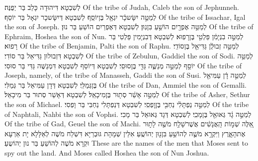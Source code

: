 {לְשִׁבְטָא דִּיהוּדָה כָּלֵב בַּר יְפֻנֶּה׃}
{Of the tribe of Judah, Caleb the son of Jephunneh.}{}
{לְמַטֵּ֣ה יִשָּׂשכָ֔ר יִגְאָ֖ל בֶּן\maqqaf יוֹסֵֽף׃}
{לְשִׁבְטָא דְּיִשָּׂשכָר יִגְאָל בַּר יוֹסֵף׃}
{Of the tribe of Issachar, Igal the son of Joseph.}{}
{לְמַטֵּ֥ה אֶפְרָ֖יִם הוֹשֵׁ֥עַ בִּן\maqqaf נֽוּן׃}
{לְשִׁבְטָא דְּאֶפְרַיִם הוֹשֵׁעַ בַּר נוּן׃}
{Of the tribe of Ephraim, Hoshea the son of Nun.}{}
{לְמַטֵּ֣ה בִנְיָמִ֔ן פַּלְטִ֖י בֶּן\maqqaf רָפֽוּא׃}
{לְשִׁבְטָא דְּבִנְיָמִין פַּלְטִי בַּר רָפוּא׃}
{Of the tribe of Benjamin, Palti the son of Raphu.}{}
{לְמַטֵּ֣ה זְבוּלֻ֔ן גַּדִּיאֵ֖ל בֶּן\maqqaf סוֹדִֽי׃}
{לְשִׁבְטָא דִּזְבוּלוּן גַּדִּיאֵל בַּר סוֹדִי׃}
{Of the tribe of Zebulun, Gaddiel the son of Sodi.}{}
{לְמַטֵּ֥ה יוֹסֵ֖ף לְמַטֵּ֣ה מְנַשֶּׁ֑ה גַּדִּ֖י בֶּן\maqqaf סוּסִֽי׃}
{לְשִׁבְטָא דְּיוֹסֵף לְשִׁבְטָא דִּמְנַשֶּׁה גַּדִּי בַּר סוּסִי׃}
{Of the tribe of Joseph, namely, of the tribe of Manasseh, Gaddi the son of Susi.}{}
{לְמַטֵּ֣ה דָ֔ן עַמִּיאֵ֖ל בֶּן\maqqaf גְּמַלִּֽי׃}
{לְשִׁבְטָא דְּדָן עַמִּיאֵל בַּר גְּמַלִּי׃}
{Of the tribe of Dan, Ammiel the son of Gemalli.}{}
{לְמַטֵּ֣ה אָשֵׁ֔ר סְת֖וּר בֶּן\maqqaf מִיכָאֵֽל׃}
{לְשִׁבְטָא דְּאָשֵׁר סְתוּר בַּר מִיכָאֵל׃}
{Of the tribe of Asher, Sethur the son of Michael.}{}
{לְמַטֵּ֣ה נַפְתָּלִ֔י נַחְבִּ֖י בֶּן\maqqaf וׇפְסִֽי׃}
{לְשִׁבְטָא דְּנַפְתָּלִי נַחְבִּי בַּר וָפְסִי׃}
{Of the tribe of Naphtali, Nahbi the son of Vophsi.}{}
{לְמַטֵּ֣ה גָ֔ד גְּאוּאֵ֖ל בֶּן\maqqaf מָכִֽי׃}
{לְשִׁבְטָא דְּגָד גְּאוּאֵל בַּר מָכִי׃}
{Of the tribe of Gad, Geuel the son of Machi.}{}
{אֵ֚לֶּה שְׁמ֣וֹת הָֽאֲנָשִׁ֔ים אֲשֶׁר\maqqaf שָׁלַ֥ח מֹשֶׁ֖ה לָת֣וּר אֶת\maqqaf הָאָ֑רֶץ וַיִּקְרָ֥א מֹשֶׁ֛ה לְהוֹשֵׁ֥עַ בִּן\maqqaf נ֖וּן יְהוֹשֻֽׁעַ׃}
{אִלֵּין שְׁמָהָת גּוּבְרַיָּא דִּשְׁלַח מֹשֶׁה לְאַלָּלָא יָת אַרְעָא וּקְרָא מֹשֶׁה לְהוֹשֵׁעַ בַּר נוּן יְהוֹשֻעַ׃}
{These are the names of the men that Moses sent to spy out the land. And Moses called Hoshea the son of Nun Joshua.}{}
